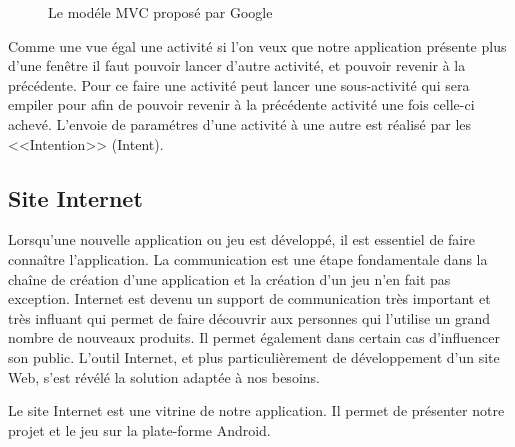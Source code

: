 \documentclass[a4paper,11pt,french]{article}
\def\android{Android\texttrademark{}}
\begin{document}
\begin{figure}[h!]
  \begin{center}
    \caption{Le modéle MVC proposé par Google}
    \label{fig:MVC}
  \end{center}
\end{figure}

Comme une vue égal une activité si l'on veux que notre application présente plus d'une fenêtre il faut pouvoir lancer d'autre activité, et pouvoir revenir à la précédente. Pour ce faire une activité peut lancer une sous-activité qui sera empiler pour afin de pouvoir revenir à la précédente activité une fois celle-ci achevé. L'envoie de paramétres d'une activité à une autre est réalisé par les <<Intention>> (Intent).




\subsection{Site Internet}

Lorsqu'une nouvelle application ou jeu est développé, il est essentiel de faire connaître l'application.
La communication est une étape fondamentale dans la chaîne de création d'une application et la création d'un jeu n'en fait pas exception.
Internet est devenu un support de communication très important et très influant qui permet de faire découvrir aux
personnes qui l'utilise un grand nombre de nouveaux produits. Il permet également dans certain cas d'influencer son public.
L'outil Internet, et plus particulièrement de développement d'un site Web, s'est révélé la solution adaptée à nos besoins.

Le site Internet est une vitrine de notre application. Il permet de présenter notre projet et le jeu sur la plate-forme \android{}.
\end{document}
